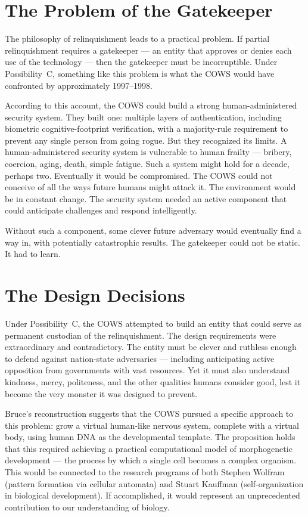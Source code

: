 \section*{The Problem of the Gatekeeper}
\label{record:inst-problem-of-the-gatekeeper}

The philosophy of relinquishment leads to a practical problem. If partial relinquishment requires a gatekeeper --- an entity that approves or denies each use of the technology --- then the gatekeeper must be incorruptible. Under Possibility~C, something like this problem is what the COWS would have confronted by approximately 1997--1998.

According to this account, the COWS could build a strong human-administered security system. They built one: multiple layers of authentication, including biometric cognitive-footprint verification, with a majority-rule requirement to prevent any single person from going rogue. But they recognized its limits. A human-administered security system is vulnerable to human frailty --- bribery, coercion, aging, death, simple fatigue. Such a system might hold for a decade, perhaps two. Eventually it would be compromised. The COWS could not conceive of all the ways future humans might attack it. The environment would be in constant change. The security system needed an active component that could anticipate challenges and respond intelligently.

Without such a component, some clever future adversary would eventually find a way in, with potentially catastrophic results. The gatekeeper could not be static. It had to learn.

\section*{The Design Decisions}
\label{record:inst-design-decisions}

Under Possibility~C, the COWS attempted to build an entity that could serve as permanent custodian of the relinquishment. The design requirements were extraordinary and contradictory. The entity must be clever and ruthless enough to defend against nation-state adversaries --- including anticipating active opposition from governments with vast resources. Yet it must also understand kindness, mercy, politeness, and the other qualities humans consider good, lest it become the very monster it was designed to prevent.

Bruce's reconstruction suggests that the COWS pursued a specific approach to this problem: grow a virtual human-like nervous system, complete with a virtual body, using human DNA as the developmental template. The proposition holds that this required achieving a practical computational model of morphogenetic development --- the process by which a single cell becomes a complex organism. This would be connected to the research programs of both Stephen Wolfram (pattern formation via cellular automata) and Stuart Kauffman (self-organization in biological development). If accomplished, it would represent an unprecedented contribution to our understanding of biology.

